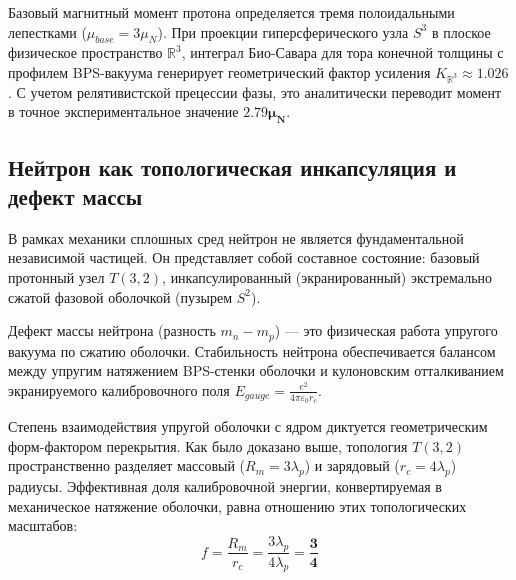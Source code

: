 \documentclass[12pt,a4paper]{article}
\begin{document}
	Базовый магнитный момент протона определяется тремя полоидальными лепестками ($\mu_{base} = 3 \mu_N$). При проекции гиперсферического узла $S^3$ в плоское физическое пространство $\mathbb{R}^3$, интеграл Био-Савара для тора конечной толщины с профилем BPS-вакуума генерирует геометрический фактор усиления $K_{\mathbb{R}^3} \approx 1.026$. С учетом релятивистской прецессии фазы, это аналитически переводит момент в точное экспериментальное значение $\mathbf{2.79 \mu_N}$.
	
	\subsection{Нейтрон как топологическая инкапсуляция и дефект массы}
	В рамках механики сплошных сред нейтрон не является фундаментальной независимой частицей. Он представляет собой составное состояние: базовый протонный узел $T(3,2)$, инкапсулированный (экранированный) экстремально сжатой фазовой оболочкой (пузырем $S^2$). 
	
	Дефект массы нейтрона (разность $m_n - m_p$) — это физическая работа упругого вакуума по сжатию оболочки. Стабильность нейтрона обеспечивается балансом между упругим натяжением BPS-стенки оболочки и кулоновским отталкиванием экранируемого калибровочного поля $E_{gauge} = \frac{e^2}{4\pi\varepsilon_0 r_c}$.
	
	Степень взаимодействия упругой оболочки с ядром диктуется геометрическим форм-фактором перекрытия. Как было доказано выше, топология $T(3,2)$ пространственно разделяет массовый ($R_m = 3 \lambda_p$) и зарядовый ($r_c = 4 \lambda_p$) радиусы. Эффективная доля калибровочной энергии, конвертируемая в механическое натяжение оболочки, равна отношению этих топологических масштабов:
	\begin{equation}
		f = \frac{R_m}{r_c} = \frac{3 \lambda_p}{4 \lambda_p} = \mathbf{\frac{3}{4}}
	\end{equation}
	
\end{document}
